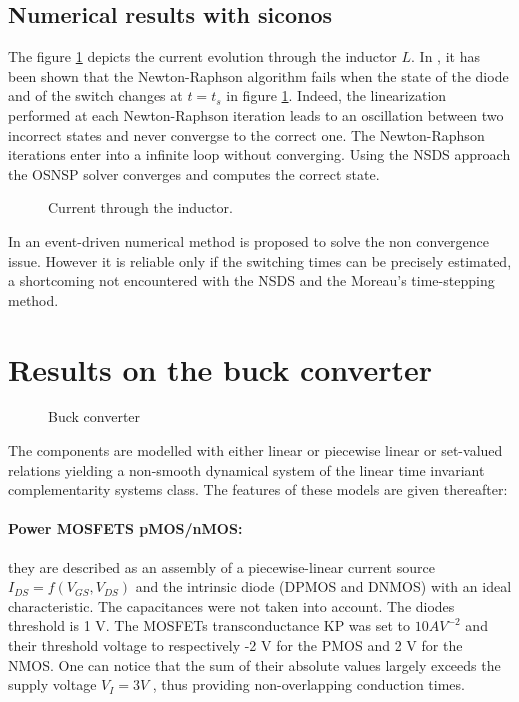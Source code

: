 \subsection{Numerical results with {\sc siconos}}
\label{section32}

The figure \ref{fig:SIMU_CS} depicts the current evolution through the inductor $L$. In \cite{maffezzoni2006}, it has been shown that the Newton-Raphson algorithm fails when the state of the diode and of the switch changes at $t=t_s$ in figure \ref{fig:SIMU_CS}. Indeed, the linearization performed at each Newton-Raphson iteration leads to an oscillation between two incorrect states and never convergse to the correct one. The Newton-Raphson iterations enter into a infinite loop without converging.  Using the NSDS approach the OSNSP solver converges and computes the correct state. 


 \begin{figure}[h]
   
  \label{fig:SIMU_CS}
\caption{Current through the inductor.}
 \end{figure}


\begin{remark}
In \cite{maffezzoni2006} an event-driven numerical method is proposed to solve the non convergence issue. However it is reliable only if the switching times can be precisely estimated, a shortcoming not encountered  with the NSDS and the  Moreau's time-stepping method. 
\end{remark}

\section{Results on the buck converter}
\label{section4}


\begin{figure}[h]
\centerline{
 \scalebox{1.0}{
    
 }
}
\caption{Buck converter}
\label{fig-Buck-converter}
\end{figure}
The components are modelled with either linear or piecewise linear or set-valued relations yielding a non-smooth dynamical system of the linear time invariant complementarity systems class. The features of these models are given thereafter:

\paragraph{Power MOSFETS pMOS/nMOS:} they are described as an assembly of a
piecewise-linear current source $I_{DS} = f(V_{GS}, V_{DS})$ and the intrinsic diode
(DPMOS and DNMOS) with an ideal characteristic.
The capacitances were not taken into account. The diodes threshold is
1 V. The MOSFETs transconductance KP was set to $10 AV^{-2}$ and
their threshold voltage to respectively -2 V for the PMOS and 2 V for
the NMOS. One can notice that the sum of their absolute values largely
exceeds the supply voltage $V_{I} = 3 V$ , thus providing non-overlapping
conduction times.
